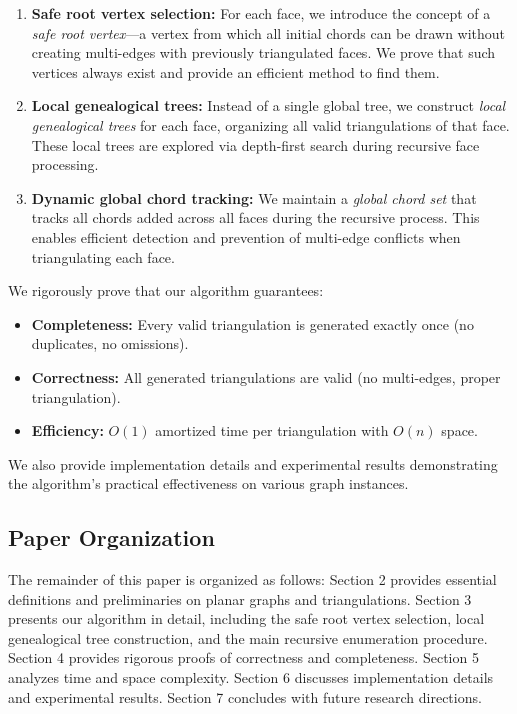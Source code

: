 \documentclass[12pt,a4paper]{article}
\theoremstyle{definition}
\theoremstyle{remark}
\begin{document}
\begin{enumerate}
    \item \textbf{Safe root vertex selection:} For each face, we introduce the concept of a \emph{safe root vertex}---a vertex from which all initial chords can be drawn without creating multi-edges with previously triangulated faces. We prove that such vertices always exist and provide an efficient method to find them.
    
    \item \textbf{Local genealogical trees:} Instead of a single global tree, we construct \emph{local genealogical trees} for each face, organizing all valid triangulations of that face. These local trees are explored via depth-first search during recursive face processing.
    
    \item \textbf{Dynamic global chord tracking:} We maintain a \emph{global chord set} that tracks all chords added across all faces during the recursive process. This enables efficient detection and prevention of multi-edge conflicts when triangulating each face.
\end{enumerate}

We rigorously prove that our algorithm guarantees:
\begin{itemize}
    \item \textbf{Completeness:} Every valid triangulation is generated exactly once (no duplicates, no omissions).
    \item \textbf{Correctness:} All generated triangulations are valid (no multi-edges, proper triangulation).
    \item \textbf{Efficiency:} $O(1)$ amortized time per triangulation with $O(n)$ space.
\end{itemize}

We also provide implementation details and experimental results demonstrating the algorithm's practical effectiveness on various graph instances.

\subsection{Paper Organization}

The remainder of this paper is organized as follows: Section 2 provides essential definitions and preliminaries on planar graphs and triangulations. Section 3 presents our algorithm in detail, including the safe root vertex selection, local genealogical tree construction, and the main recursive enumeration procedure. Section 4 provides rigorous proofs of correctness and completeness. Section 5 analyzes time and space complexity. Section 6 discusses implementation details and experimental results. Section 7 concludes with future research directions.
\end{document}
